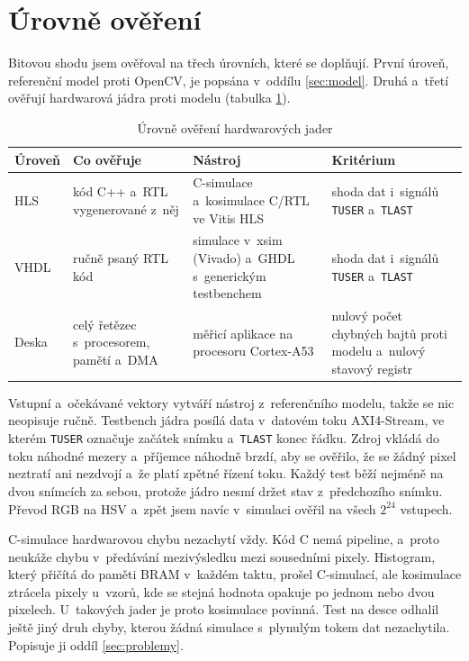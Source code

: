\documentclass[FM,DP]{tulthesis}
\begin{document}
\section{Úrovně ověření}
\label{sec:overeni}

Bitovou shodu jsem ověřoval na třech úrovních, které se doplňují. První úroveň,
referenční model proti OpenCV, je popsána v~oddílu \ref{sec:model}. Druhá
a~třetí ověřují hardwarová jádra proti modelu (tabulka \ref{tab:urovne}).

\begin{table}[htbp]
    \centering
    \caption{Úrovně ověření hardwarových jader}
    \label{tab:urovne}
    \begin{tabular}{p{2.4cm}p{3.6cm}p{3.4cm}p{3.7cm}}
        \toprule
        Úroveň & Co ověřuje                              & Nástroj                                                  & Kritérium                                                         \\
        \midrule
        HLS    & kód C++ a~RTL vygenerované z~něj        & C-simulace a~kosimulace C/RTL ve Vitis HLS               & shoda dat i~signálů \texttt{TUSER} a~\texttt{TLAST}               \\
        VHDL   & ručně psaný RTL kód                     & simulace v~xsim (Vivado) a~GHDL s~generickým testbenchem & shoda dat i~signálů \texttt{TUSER} a~\texttt{TLAST}               \\
        Deska  & celý řetězec s~procesorem, pamětí a~DMA & měřicí aplikace na procesoru Cortex-A53                  & nulový počet chybných bajtů proti modelu a~nulový stavový registr \\
        \bottomrule
    \end{tabular}
\end{table}

Vstupní a~očekávané vektory vytváří nástroj z~referenčního modelu, takže se nic
neopisuje ručně. Testbench jádra posílá data v~datovém toku \acs{AXI}4-Stream,
ve kterém \texttt{TUSER} označuje začátek snímku a~\texttt{TLAST} konec řádku.
Zdroj vkládá do toku náhodné mezery a~příjemce náhodně brzdí, aby se ověřilo,
že se žádný pixel neztratí ani nezdvojí a~že platí zpětné řízení toku. Každý
test běží nejméně na dvou snímcích za sebou, protože jádro nesmí držet stav
z~předchozího snímku. Převod RGB na HSV a~zpět jsem navíc v~simulaci ověřil na
všech $2^{24}$ vstupech.

C-simulace hardwarovou chybu nezachytí vždy. Kód C nemá pipeline, a~proto
neukáže chybu v~předávání mezivýsledku mezi sousedními pixely. Histogram, který
přičítá do paměti \ac{BRAM} v~každém taktu, prošel C-simulací, ale kosimulace
ztrácela pixely u~vzorů, kde se stejná hodnota opakuje po jednom nebo dvou
pixelech. U~takových jader je proto kosimulace povinná. Test na desce odhalil
ještě jiný druh chyby, kterou žádná simulace s~plynulým tokem dat nezachytila.
Popisuje ji oddíl \ref{sec:problemy}.
\end{document}
